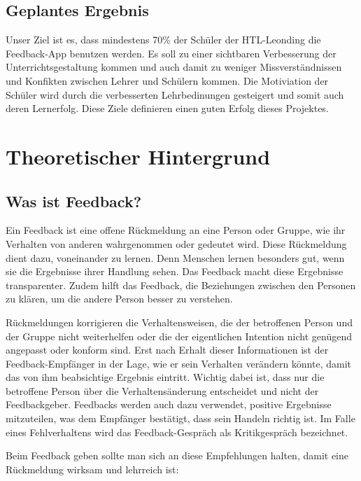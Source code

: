 \subsection{Geplantes Ergebnis}
Unser Ziel ist es, dass mindestens 70\% der Schüler der HTL-Leonding die Feedback-App benutzen werden. 
Es soll zu einer sichtbaren Verbesserung der Unterrichtsgestaltung kommen und auch damit zu weniger Missverständnissen 
und Konfikten zwischen Lehrer und Schülern kommen. Die Motiviation der Schüler wird durch die verbesserten Lehrbedinungen gesteigert und 
somit auch deren Lernerfolg.
Diese Ziele definieren einen guten Erfolg dieses Projektes.

\section{Theoretischer Hintergrund}
\cite{BWLHTLbook}
\cite{FeedbackBWissen}

\subsection{Was ist Feedback?}

Ein Feedback ist eine offene Rückmeldung an eine Person oder Gruppe, wie ihr Verhalten von anderen 
wahrgenommen oder gedeutet wird. Diese Rückmeldung dient dazu, voneinander zu lernen. Denn Menschen lernen 
besonders gut, wenn sie die Ergebnisse ihrer Handlung sehen. Das Feedback macht diese Ergebnisse transparenter. 
Zudem hilft das Feedback, die Beziehungen zwischen den Personen zu klären, um die andere Person besser zu verstehen.

Rückmeldungen korrigieren die Verhaltensweisen, die der betroffenen Person und der Gruppe nicht weiterhelfen oder 
die der eigentlichen Intention nicht genügend angepasst oder konform sind. Erst nach Erhalt dieser Informationen ist der 
Feedback-Empfänger in der Lage, wie er sein Verhalten verändern könnte, damit das von ihm beabsichtige Ergebnis eintritt. 
Wichtig dabei ist, dass nur die betroffene Person über die Verhaltensänderung entscheidet und nicht der Feedbackgeber. 
Feedbacks werden auch dazu verwendet, positive Ergebnisse mitzuteilen, was dem Empfänger bestätigt, dass sein Handeln richtig ist.
Im Falle eines Fehlverhaltens wird das Feedback-Gespräch als Kritikgespräch bezeichnet.

Beim Feedback geben sollte man sich an diese Empfehlungen halten, damit eine Rückmeldung wirksam und lehrreich ist:

